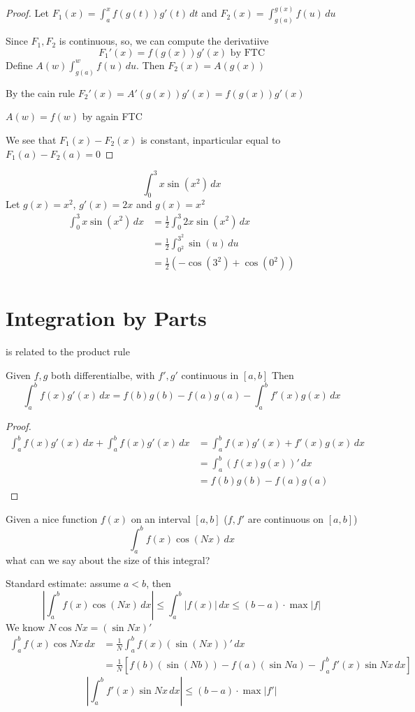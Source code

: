 \begin{proof}
  Let $\displaystyle F_1(x) = \int_a^x f(g(t))g'(t)\,dt$ and $\displaystyle F_2(x) = \int_{g(a)}^{g(x)} f(u)\,du$

  Since $F_1, F_2$ is continuous, so, we can compute the derivatiive
  \[F_1'(x) = f(g(x))g'(x) \text{ by FTC} \]
  Define $\displaystyle A(w) \int_{g(a)}^w f(u)\,du$. Then $F_2(x) = A(g(x))$

  By the cain rule $F_2'(x) = A'(g(x))g'(x) = f(g(x))g'(x)$

  $A(w) = f(w)$ by again FTC

  We see that $F_1(x) - F_2(x)$ is constant, inparticular equal to $F_1(a) - F_2(a) = 0$
\end{proof}

\begin{example*}
  \[\int_0^3 x \sin(x^2) \, dx\]
  Let $g(x) = x^2$, $g'(x) = 2x$ and $g(x) = x^2$
  \begin{align*}
  \int_0^3 x \sin(x^2) \, dx &= \frac{1}{2} \int_0^3 2x \sin(x^2)\,dx \\
  &= \frac{1}{2} \int_{0^2}^{3^2} \sin(u)\, du \\
  &= \frac{1}{2}(-\cos(3^2) + \cos(0^2)) \\
  \end{align*}
\end{example*}

\section{Integration by Parts}
is related to the product rule
\begin{theorem*}
  Given $f, g$ both differentialbe, with $f', g'$ continuous in $[a, b]$
  Then
  \[\int_a^b f(x)g'(x)\,dx = f(b)g(b) - f(a)g(a) - \int_a^b f'(x)g(x)\,dx\]
\end{theorem*}

\begin{proof}
  \begin{align*}
    \int_a^b f(x)g'(x)\,dx + \int_a^b f(x)g'(x)\, dx &= \int_a^b f(x)g'(x) + f'(x)g(x)\, dx \\
    &= \int_a^b (f(x)g(x))'\, dx \\
    &= f(b)g(b) - f(a)g(a)
  \end{align*}
\end{proof}

\begin{example*}
Given a nice function $f(x)$ on an interval $[a, b]$ ($f, f'$ are continuous on $[a, b]$)
\[\int_a^b f(x)\cos(Nx)\, dx\]
what can we say about the size of this integral?

Standard estimate: assume $a < b$, then 
\[\left|\int_a^b f(x)\cos(Nx)\,dx\right| \le \int_a^b |f(x)|\,dx \le (b-a)\cdot \max|f|\]
We know $N\cos Nx = (\sin Nx)'$
\begin{align*}
  \int_a^b f(x)\cos Nx\, dx &= \frac{1}{N} \int_a^b f(x)(\sin(Nx))'\,dx \\
  &= \frac{1}{N}\left[f(b)(\sin(Nb)) - f(a)(\sin Na) - \int_a^b f'(x)\sin Nx\, dx\right]
\end{align*}
\[\left|\int_a^b f'(x)\sin Nx\, dx \right| \le (b-a)\cdot \max|f'|\]
\end{example*}


